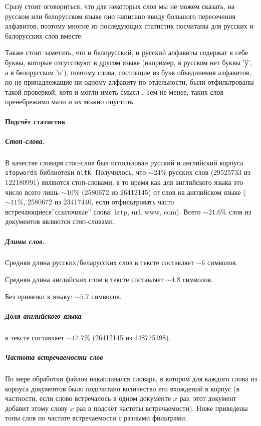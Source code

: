 Сразу стоит оговориться, что для некоторых слов мы не можем сказать, на русском или белорусском языке оно написано ввиду большого пересечения алфавитов, поэтому многие из последующих статистик посчитаны для русских и балорусских слов вместе.

Также стоит заметить, что и белорусский, и русский алфавиты содержат в себе буквы, которые отсутствуют в другом языке (например, в русском нет буквы 'ў', а в белорусском 'и'), поэтому слова, состоящие из букв объединения алфавитов, но не принадлежащие ни одному алфавиту по отдельности, были отфильтрованы такой проверкой, хотя и могли иметь смысл . Тем не менее, таких слов пренебрежимо мало и их можно опустить.


\paragraph{Подсчёт статистик}

\subparagraph{Стоп-слова.}

В качестве словаря стоп-слов был использован русский и английский корпуса \texttt{stopwords} библиотеки \texttt{nltk}. Получилось, что $\sim24\%$ русских слов (29525733 из 122180991) являются стоп-словами, в то время как для английского языка это число всего лишь $\sim10\%$ (2580672 из 26412145) от слов на английском языке ($\sim11\%$, 2580672 из 23417440, если отфильтровать часто встречающиеся''ссылочные'' слова: http, url, www, com). Всего $\sim 21.6\%$ слов из документов являются стоп-словами. 

\subparagraph{Длины слов.}

Средняя длина русских/беларусских слов в тексте составляет $\sim 6$ символов.

Средняя длина английских слов в тексте составляет $\sim 4.8$ символов.

Без привязки к языку: $\sim 5.7$ символов.


\subparagraph{Доля английского языка} в тексте составляет $\sim 17.7\%$ (26412145 из 148775198).

\subparagraph{Частота встречаемости слов}

По мере обработки файлов накапливался словарь, в котором для каждого слова из корпуса документов было подсчитано количество его вхождений в корпус (в частности, если слово встречалось в одном документе $x$ раз, этот документ добавит этому слову $x$ раз в подсчёт частоты встречаемости). Ниже приведены топы слов по частоте встречаемости с разными фильтрами: 

